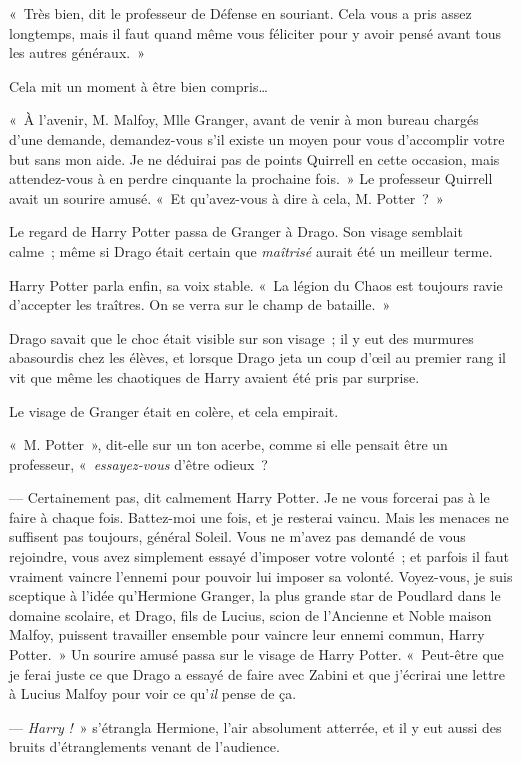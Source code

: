 «~Très bien, dit le professeur de Défense en souriant.
Cela vous a pris assez longtemps, mais il faut quand même vous féliciter pour y avoir pensé avant tous les autres généraux.~»

Cela mit un moment à être bien compris…

«~À l'avenir, M. Malfoy, Mlle Granger, avant de venir à mon bureau chargés d'une demande, demandez-vous s'il existe un moyen pour vous d'accomplir votre but sans mon aide.
Je ne déduirai pas de points Quirrell en cette occasion, mais attendez-vous à en perdre cinquante la prochaine fois.~»
Le professeur Quirrell avait un sourire amusé.
«~Et qu'avez-vous à dire à cela, M. Potter~?~»

Le regard de Harry Potter passa de Granger à Drago.
Son visage semblait calme~; même si Drago était certain que \emph{maîtrisé} aurait été un meilleur terme.

Harry Potter parla enfin, sa voix stable.
«~La légion du Chaos est toujours ravie d'accepter les traîtres.
On se verra sur le champ de bataille.~»

Drago savait que le choc était visible sur son visage~; il y eut des murmures abasourdis chez les élèves, et lorsque Drago jeta un coup d'œil au premier rang il vit que même les chaotiques de Harry avaient été pris par surprise.

Le visage de Granger était en colère, et cela empirait.

«~M. Potter~», dit-elle sur un ton acerbe, comme si elle pensait être un professeur, «~\emph{essayez-vous} d'être odieux~?

--- Certainement pas, dit calmement Harry Potter.
Je ne vous forcerai pas à le faire à chaque fois.
Battez-moi une fois, et je resterai vaincu.
Mais les menaces ne suffisent pas toujours, général Soleil.
Vous ne m'avez pas demandé de vous rejoindre, vous avez simplement essayé d'imposer votre volonté~; et parfois il faut vraiment vaincre l'ennemi pour pouvoir lui imposer sa volonté.
Voyez-vous, je suis sceptique à l'idée qu'Hermione Granger, la plus grande star de Poudlard dans le domaine scolaire, et Drago, fils de Lucius, scion de l'Ancienne et Noble maison Malfoy, puissent travailler ensemble pour vaincre leur ennemi commun, Harry Potter.~»
Un sourire amusé passa sur le visage de Harry Potter.
«~Peut-être que je ferai juste ce que Drago a essayé de faire avec Zabini et que j'écrirai une lettre à Lucius Malfoy pour voir ce qu'\emph{il} pense de ça.

--- \emph{Harry} \emph{!}~» s'étrangla Hermione, l'air absolument atterrée, et il y eut aussi des bruits d'étranglements venant de l'audience.

